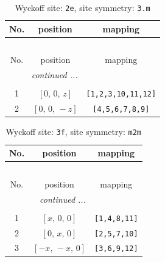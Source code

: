 \documentclass[fleqn,8pt]{jsarticle}
\begin{document}
\begin{longtable}{ccc}
\caption{Wyckoff site: {\tt 2e}, site symmetry: {\tt 3.m}}
 \\
 \hline \hline
No. & position & mapping \\ \hline \endfirsthead

\multicolumn{2}{l}{\tablename\ \thetable{}} \\
 \hline \hline
No. & position & mapping \\ \hline \endhead

 \hline \hline
\multicolumn{2}{r}{\footnotesize\it continued ...} \\ \endfoot

 \hline \hline
\multicolumn{2}{r}{} \\ \endlastfoot

1 & $\left[ 0,\, 0,\, z \right]$ & {\tt [1,2,3,10,11,12]} \\ \hline
2 & $\left[ 0,\, 0,\, - z \right]$ & {\tt [4,5,6,7,8,9]} \\
\end{longtable}
\renewcommand{\arraystretch}{1.2}
\begin{longtable}{ccc}
\caption{Wyckoff site: {\tt 3f}, site symmetry: {\tt m2m}}
 \\
 \hline \hline
No. & position & mapping \\ \hline \endfirsthead

\multicolumn{2}{l}{\tablename\ \thetable{}} \\
 \hline \hline
No. & position & mapping \\ \hline \endhead

 \hline \hline
\multicolumn{2}{r}{\footnotesize\it continued ...} \\ \endfoot

 \hline \hline
\multicolumn{2}{r}{} \\ \endlastfoot

1 & $\left[ x,\, 0,\, 0 \right]$ & {\tt [1,4,8,11]} \\ \hline
2 & $\left[ 0,\, x,\, 0 \right]$ & {\tt [2,5,7,10]} \\ \hline
3 & $\left[ - x,\, - x,\, 0 \right]$ & {\tt [3,6,9,12]} \\
\end{longtable}
\renewcommand{\arraystretch}{1.2}
\end{document}
